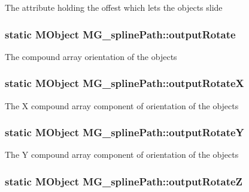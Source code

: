 The attribute holding the offest which lets the objects slide \hypertarget{class_m_g__spline_path_abf44c1e8fbd1d839310e21c7d423344c}{
\subsubsection[{output\-Rotate}]{\setlength{\rightskip}{0pt plus 5cm}static M\-Object M\-G\-\_\-spline\-Path\-::output\-Rotate\hspace{0.3cm}{\ttfamily [static]}}}\label{class_m_g__spline_path_abf44c1e8fbd1d839310e21c7d423344c}
The compound array orientation of the objects \hypertarget{class_m_g__spline_path_aa91a8ca94034b2565de8f19809836f91}{
\subsubsection[{output\-Rotate\-X}]{\setlength{\rightskip}{0pt plus 5cm}static M\-Object M\-G\-\_\-spline\-Path\-::output\-Rotate\-X\hspace{0.3cm}{\ttfamily [static]}}}\label{class_m_g__spline_path_aa91a8ca94034b2565de8f19809836f91}
The X compound array component of orientation of the objects \hypertarget{class_m_g__spline_path_a1f09258c7e2be297cda96d1f68dcb8d3}{
\subsubsection[{output\-Rotate\-Y}]{\setlength{\rightskip}{0pt plus 5cm}static M\-Object M\-G\-\_\-spline\-Path\-::output\-Rotate\-Y\hspace{0.3cm}{\ttfamily [static]}}}\label{class_m_g__spline_path_a1f09258c7e2be297cda96d1f68dcb8d3}
The Y compound array component of orientation of the objects \hypertarget{class_m_g__spline_path_a315a706b9954548e9163ff578deaffe8}{
\subsubsection[{output\-Rotate\-Z}]{\setlength{\rightskip}{0pt plus 5cm}static M\-Object M\-G\-\_\-spline\-Path\-::output\-Rotate\-Z\hspace{0.3cm}{\ttfamily [static]}}}\label{class_m_g__spline_path_a315a706b9954548e9163ff578deaffe8}

